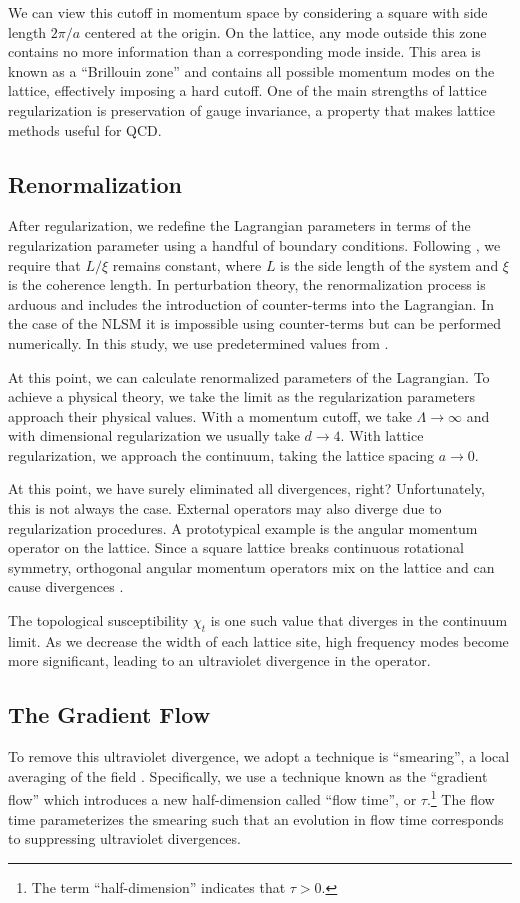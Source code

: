 We can view this cutoff in momentum space by considering a square with side length $2\pi/a$ centered at the origin. On the lattice, any mode outside this zone contains no more information than a corresponding mode inside. This area is known as a ``Brillouin zone'' and contains all possible momentum modes on the lattice, effectively imposing a hard cutoff. One of the main strengths of lattice regularization is preservation of gauge invariance, a property that makes lattice methods useful for QCD.


\subsection{Renormalization}
After regularization, we redefine the Lagrangian parameters in terms of the regularization parameter using a handful of boundary conditions. Following \cite{bietenholz2018}, we require that $L/\xi$ remains constant, where $L$ is the side length of the system and $\xi$ is the coherence length. In perturbation theory, the renormalization process is arduous and includes the introduction of counter-terms into the Lagrangian. In the case of the NLSM it is impossible using counter-terms but can be performed numerically. In this study, we use predetermined values from \cite{bietenholz2018}.

At this point, we can calculate renormalized parameters of the Lagrangian. To achieve a physical theory, we take the limit as the regularization parameters approach their physical values. With a momentum cutoff, we take $\Lambda \rightarrow \infty$ and with dimensional regularization we usually take $d\rightarrow 4$. With lattice regularization, we approach the continuum, taking the lattice spacing $a\rightarrow 0$. 

At this point, we have surely eliminated all divergences, right? Unfortunately, this is not always the case. External operators may also diverge due to regularization procedures. A prototypical example is the angular momentum operator on the lattice. Since a square lattice breaks continuous rotational symmetry, orthogonal angular momentum operators mix on the lattice and can cause divergences \cite{monahan2016}. 

The topological susceptibility $\chi_t$ is one such value that diverges in the continuum limit. As we decrease the width of each lattice site, high frequency modes become more significant, leading to an ultraviolet divergence in the operator. 

\subsection{The Gradient Flow}
\label{sec:gradflow}
To remove this ultraviolet divergence, we adopt a technique is ``smearing'', a local averaging of the field \cite{solbrig2008}. Specifically, we use a technique known as the ``gradient flow'' \cite{monahan2015} which introduces a new half-dimension called ``flow time'', or $\tau$.\footnote{The term ``half-dimension'' indicates that $\tau>0$.}  The flow time parameterizes the smearing such that an evolution in flow time corresponds to suppressing ultraviolet divergences. 

